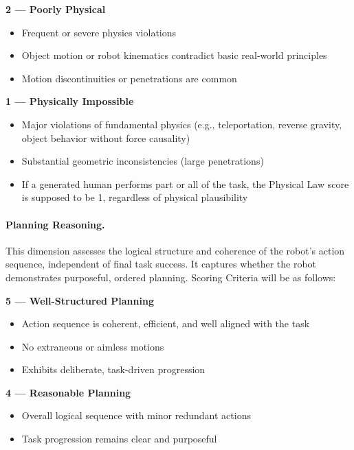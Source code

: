 \textbf{2 — Poorly Physical}\par
\begin{itemize}
    \item Frequent or severe physics violations
    \item Object motion or robot kinematics contradict basic real-world principles
    \item Motion discontinuities or penetrations are common
\end{itemize}

\textbf{1 — Physically Impossible}\par
\begin{itemize}
    \item Major violations of fundamental physics (e.g., teleportation, reverse gravity, object behavior without force causality)
    \item Substantial geometric inconsistencies (large penetrations)
    \item If a generated human performs part or all of the task, the Physical Law score is supposed to be 1, regardless of physical plausibility
\end{itemize}

\paragraph{Planning Reasoning.} This dimension assesses the logical structure and coherence of the robot’s action sequence, independent of final task success.
It captures whether the robot demonstrates purposeful, ordered planning.
Scoring Criteria will be as follows:

\textbf{5 — Well-Structured Planning}\par
\begin{itemize}
    \item Action sequence is coherent, efficient, and well aligned with the task
    \item No extraneous or aimless motions
    \item Exhibits deliberate, task-driven progression
\end{itemize}

\textbf{4 — Reasonable Planning}\par
\begin{itemize}
    \item Overall logical sequence with minor redundant actions
    \item Task progression remains clear and purposeful
\end{itemize}
 
